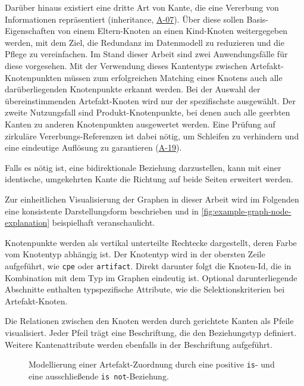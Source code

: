 Darüber hinaus existiert eine dritte Art von Kante, die eine Vererbung von Informationen repräsentiert (inheritance, \hyperref[subsec:req-selektor-inheritance]{A-07}).
Über diese sollen Basis-Eigenschaften von einem Eltern-Knoten an einen Kind-Knoten weitergegeben werden, mit dem Ziel, die Redundanz im Datenmodell zu reduzieren und die Pflege zu vereinfachen.
Im Stand dieser Arbeit sind zwei Anwendungsfälle für diese vorgesehen.
Mit der Verwendung dieses Kantentyps zwischen Artefakt-Knotenpunkten müssen zum erfolgreichen Matching eines Knotens auch alle darüberliegenden Knotenpunkte erkannt werden.
Bei der Auswahl der übereinstimmenden Artefakt-Knoten wird nur der spezifischste ausgewählt.
Der zweite Nutzungsfall sind Produkt-Knotenpunkte, bei denen auch alle geerbten Kanten zu anderen Knotenpunkten ausgewertet werden.
Eine Prüfung auf zirkuläre Vererbungs-Referenzen ist dabei nötig, um Schleifen zu verhindern und eine eindeutige Auflösung zu garantieren (\hyperref[subsec:req-graph-inner-consistency]{A-19}).

Falls es nötig ist, eine bidirektionale Beziehung darzustellen, kann mit einer identische, umgekehrten Kante die Richtung auf beide Seiten erweitert werden.

\medskip

Zur einheitlichen Visualisierung der Graphen in dieser Arbeit wird im Folgenden eine konsistente Darstellungsform beschrieben und in \autoref{fig:example-graph-node-explanation} beispielhaft veranschaulicht.

Knotenpunkte werden als vertikal unterteilte Rechtecke dargestellt, deren Farbe vom Knotentyp abhängig ist.
Der Knotentyp wird in der obersten Zeile aufgeführt, wie \texttt{cpe} oder \texttt{artifact}.
Direkt darunter folgt die Knoten-Id, die in Kombination mit dem Typ im Graphen eindeutig ist.
Optional darunterliegende Abschnitte enthalten typspezifische Attribute, wie die Selektionskriterien bei Artefakt-Knoten.

Die Relationen zwischen den Knoten werden durch gerichtete Kanten als Pfeile visualisiert.
Jeder Pfeil trägt eine Beschriftung, die den Beziehungstyp definiert.
Weitere Kantenattribute werden ebenfalls in der Beschriftung aufgeführt.

\begin{figure}[htbp]
    \centering
    \makebox[\textwidth]{}
    \caption{Modellierung einer Artefakt-Zuordnung durch eine positive \texttt{is}- und eine ausschließende \texttt{is not}-Beziehung.}
    \label{fig:example-graph-node-explanation}
\end{figure}

